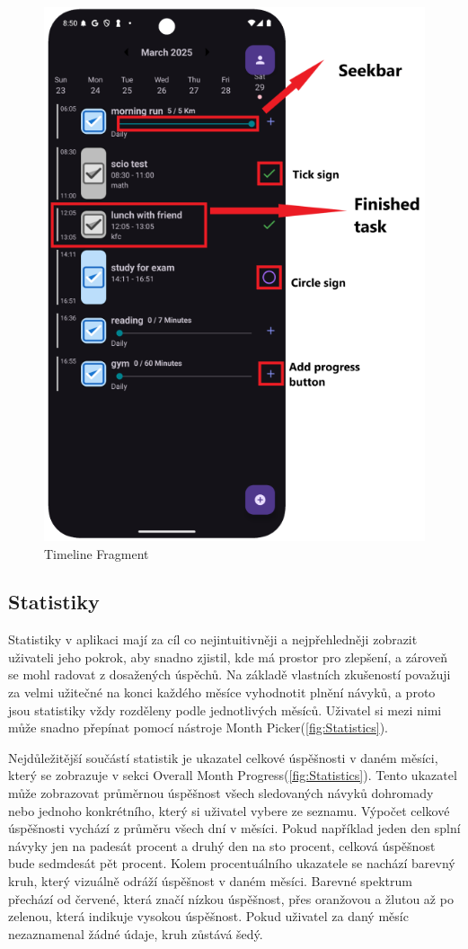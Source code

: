 \begin{figure}[H]
    \centering
    \includegraphics[width=0.6\linewidth]{images/timeline.png}
    \caption{Timeline Fragment}
    \label{fig:enter-label}
\end{figure}


\newpage

\subsection{Statistiky}
\hspace{14pt} Statistiky v aplikaci mají za cíl co nejintuitivněji a nejpřehledněji zobrazit uživateli jeho pokrok, aby snadno zjistil, kde má prostor pro zlepšení, a zároveň se mohl radovat z dosažených úspěchů. Na základě vlastních zkušeností považuji za velmi užitečné na konci každého měsíce vyhodnotit plnění návyků, a proto jsou statistiky vždy rozděleny podle jednotlivých měsíců. Uživatel si mezi nimi může snadno přepínat pomocí nástroje Month Picker(\autoref{fig:Statistics}).  

Nejdůležitější součástí statistik je ukazatel celkové úspěšnosti v daném měsíci, který se zobrazuje v sekci Overall Month Progress(\autoref{fig:Statistics}). Tento ukazatel může zobrazovat průměrnou úspěšnost všech sledovaných návyků dohromady nebo jednoho konkrétního, který si uživatel vybere ze seznamu. Výpočet celkové úspěšnosti vychází z průměru všech dní v měsíci. Pokud například jeden den splní návyky jen na padesát procent a druhý den na sto procent, celková úspěšnost bude sedmdesát pět procent. Kolem procentuálního ukazatele se nachází barevný kruh, který vizuálně odráží úspěšnost v daném měsíci. Barevné spektrum přechází od červené, která značí nízkou úspěšnost, přes oranžovou a žlutou až po zelenou, která indikuje vysokou úspěšnost. Pokud uživatel za daný měsíc nezaznamenal žádné údaje, kruh zůstává šedý.  

